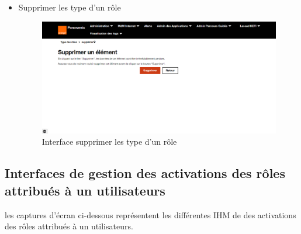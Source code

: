 \begin{itemize}
	\item Supprimer les type d'un rôle 
	\begin{figure}[H]
		\centering
		\includegraphics[width=0.5\linewidth]{"img/screenshots/type roles/delete"}
		\caption[Interface supprimer les type d'un rôle]{Interface supprimer les type d'un rôle}
		\label{fig:delete-tr}
	\end{figure}
\end{itemize}
\subsection{Interfaces de gestion des activations des rôles attribués à un utilisateurs}
les captures d'écran ci-dessous représentent les différentes IHM de des activations des rôles attribués à un utilisateurs.
